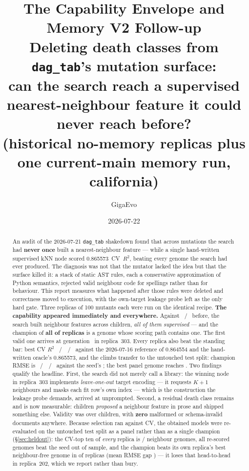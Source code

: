 \documentclass[11pt]{article}
\title{\color{accent}\bfseries The Capability Envelope and Memory V2 Follow-up\\
\large Deleting death classes from \texttt{dag\_tab}'s mutation surface:\\
can the search reach a supervised nearest-neighbour feature it could never reach before?\\
\large (historical no-memory replicas plus one current-main memory run, california)}
\author{GigaEvo}
\date{2026-07-22}
\newcommand{\rB}{\textcolor{warm}{replica~202}}
\newcommand{\rC}{\textcolor{good}{replica~303}}
\begin{document}
\maketitle

\begin{abstract}
\noindent
An audit of the 2026-07-21 \texttt{dag\_tab} shakedown found that across
\priorPrograms{} mutations the search had \textbf{never once} built a
nearest-neighbour feature --- while a single hand-written supervised kNN node scored
0.865573~CV~$R^2$, beating every genome the search had ever produced. The diagnosis was not
that the mutator lacked the idea but that the surface killed it: a stack of static
AST rules, each a conservative approximation of Python semantics, rejected valid
neighbour code for spellings rather than for behaviour. This report measures what
happened after those rules were deleted and correctness moved to execution, with the
own-target leakage probe left as the only hard gate. Three replicas of 100 mutants each
were run on the identical recipe. \textbf{The capability appeared immediately and
everywhere.} Against \priorNbrBuilt{}~/~\priorPrograms{} before, the search built
\allNbrBuilt{} neighbour features across \allPrograms{} children, \emph{all
\allNbrSup{} of them supervised} --- and the champion of \textbf{all
\allChampReplicas{} of \allReplicas{} replicas} is a genome whose scoring path contains one.
The first valid one arrives at generation~\rCNbrGenFirst{} in \rC{}. Every replica also beat
the standing bar: best CV $R^2$ \rABestCV{}~/~\rBBestCV{}~/~\rCBestCV{} against the
2026-07-16 reference of 0.864554 and the hand-written oracle's 0.865573, and the climbs
transfer to the untouched test split: champion RMSE is
\rABestRmse{}~/~\rBBestRmse{}~/~\rCBestRmse{} against the seed's \rASeedRmse{}; the best
panel genome reaches \allPanelBestRmse{}. Two
findings qualify the headline. First, the search did not merely call a library: the winning
node in \rC{} implements \emph{leave-one-out} target encoding --- it requests $K{+}1$
neighbours and masks each fit row's own index --- which is the construction the leakage
probe demands, arrived at unprompted. Second, a residual death class remains and is now
measurable: \allNbrMentionOnly{} children \emph{proposed} a neighbour feature in prose and
shipped something else. Validity was \allValidPct{} over \allPrograms{} children, with
\textbf{zero} malformed or schema-invalid documents anywhere. Because selection ran against
CV, the obtained models were re-evaluated on the untouched test split as a panel rather than
as a single champion (\S\ref{sec:heldout}): the CV-top ten of \emph{every} replica is
\allPanelNbr{}/\allPanelNbr{} neighbour genomes, all \allPanelScored{} re-scored genomes beat
the seed out of sample, and the champion beats its own replica's best neighbour-free genome
in \allNbrGapRmseWins{} of \allReplicas{} replicas (mean RMSE gap
\allNbrGapRmseMean{}) --- it loses
that head-to-head in \rB{}, which we report rather than bury.


\end{abstract}
\end{document}
